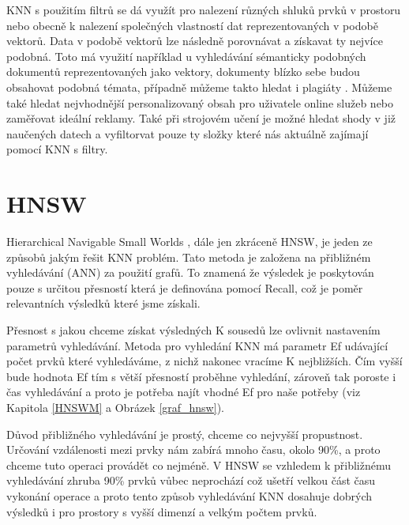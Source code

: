 \documentclass[czech,semestral,dept460,male,csharp,cpdeclaration]{diploma}
\begin{document}
		KNN s použitím filtrů se dá využít pro nalezení různých shluků prvků v prostoru nebo obecně k nalezení společných vlastností dat reprezentovaných v podobě vektorů. Data v podobě vektorů lze následně porovnávat a získavat ty nejvíce podobná. Toto má využití například u vyhledávání sémanticky podobných dokumentů reprezentovaných jako vektory, dokumenty blízko sebe budou obsahovat podobná témata, případně můžeme takto hledat i plagiáty \cite{KNN-Real-World}. Můžeme také hledat nejvhodnější personalizovaný obsah pro uživatele online služeb nebo zaměřovat ideální reklamy. Také při strojovém učení je možné hledat shody v již naučených datech a vyfiltorvat pouze ty složky které nás aktuálně zajímají pomocí KNN s filtry.
	
	\chapter{HNSW}
	\label{chap_hnsw}
	
		Hierarchical Navigable Small Worlds \cite{malkov2018efficient}, dále jen zkráceně HNSW, je jeden ze způsobů jakým řešit KNN problém. Tato metoda je založena na přibližném vyhledávání (ANN) za použití grafů. To znamená že výsledek je poskytován pouze s určitou přesností která je definována pomocí Recall, což je poměr relevantních výsledků které jsme získali.
		
		Přesnost s jakou chceme získat výsledných K sousedů lze ovlivnit nastavením parametrů vyhledávání. Metoda pro vyhledání KNN má parametr Ef udávající počet prvků které vyhledáváme, z nichž nakonec vracíme K nejbližších. Čím vyšší bude hodnota Ef tím s větší přesností proběhne vyhledání, zároveň tak poroste i čas vyhledávání a proto je potřeba najít vhodné Ef pro naše potřeby (viz Kapitola \ref{HNSWM} a Obrázek \ref{graf_hnsw}).
		
		Důvod přibližného vyhledávání je prostý, chceme co nejvyšší propustnost. Určování vzdálenosti mezi prvky nám zabírá mnoho času, okolo 90\%, a proto chceme tuto operaci provádět co nejméně. V HNSW se vzhledem k přibližnému vyhledávání zhruba 90\% prvků vůbec neprochází což ušetří velkou část času vykonání operace a proto tento způsob vyhledávání KNN dosahuje dobrých výsledků i pro prostory s vyšší dimenzí a velkým počtem prvků.
		
\end{document}
